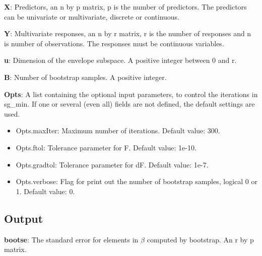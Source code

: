 \documentclass[a4paper,11pt,openany]{memoir}
\begin{document}
\begin{par}
\textbf{X}: Predictors, an n by p matrix, p is the number of predictors.  The predictors can be univariate or multivariate, discrete or continuous.
\end{par} \vspace{1em}
\begin{par}
\textbf{Y}: Multivariate responses, an n by r matrix, r is the number of responses and n is number of observations.  The responses must be continuous variables.
\end{par} \vspace{1em}
\begin{par}
\textbf{u}: Dimension of the envelope subspace.  A positive integer between 0 and r.
\end{par} \vspace{1em}
\begin{par}
\textbf{B}: Number of bootstrap samples.  A positive integer.
\end{par} \vspace{1em}
\begin{par}
\textbf{Opts}: A list containing the optional input parameters, to control the iterations in sg\_min. If one or several (even all) fields are not defined, the default settings are used.
\end{par} \vspace{1em}
\begin{itemize}
\setlength{\itemsep}{-1ex}
   \item Opts.maxIter: Maximum number of iterations.  Default value: 300.
   \item Opts.ftol: Tolerance parameter for F.  Default value: 1e-10.
   \item Opts.gradtol: Tolerance parameter for dF.  Default value: 1e-7.
   \item Opts.verbose: Flag for print out the number of bootstrap samples, logical 0 or 1. Default value: 0.
\end{itemize}


\subsection*{Output}

\begin{par}
\textbf{bootse}: The standard error for elements in $\beta$ computed by bootstrap.  An r by p matrix.
\end{par} \vspace{1em}
\end{document}
